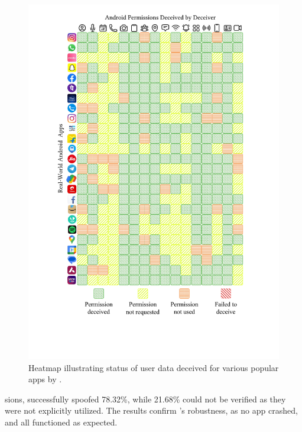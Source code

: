 \begin{figure}
    \centering
    \includegraphics[width=0.6\linewidth]{Figures/Introduction/heatmap.pdf}
    \caption{Heatmap illustrating status of user data deceived for various popular apps by \framework{}.}
    \label{fig:intro_heatmap}
    \vspace{-20pt}
\end{figure}

\noindent sions, \framework{} successfully spoofed 78.32\%, while 21.68\% could not be verified as they were not explicitly utilized. The results confirm \framework{}'s robustness, as no app crashed, and all functioned as expected.


